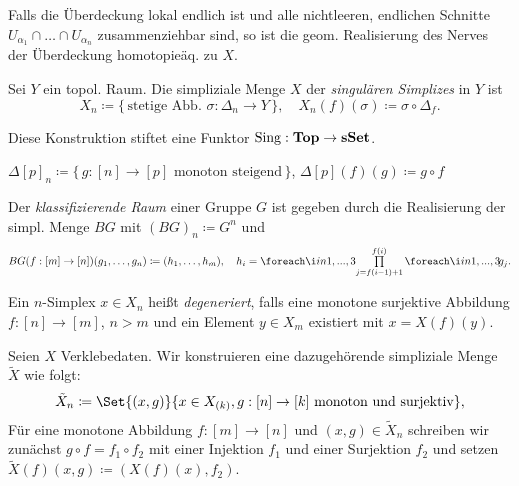 \documentclass{cheat-sheet}
\newcommand{\nspace}[1]{\foreach \i in {1,...,#1}{ \! }} %
\DeclareMathOperator{\Sing}{Sing} %
\begin{document}
\begin{bem}
  Falls die Überdeckung lokal endlich ist und alle nichtleeren, endlichen Schnitte $U_{\alpha_1} \cap \ldots \cap U_{\alpha_n}$ zusammenziehbar sind, so ist die geom. Realisierung des Nerves der Überdeckung homotopieäq. zu $X$.
\end{bem}

\begin{defn}
  Sei $Y$ ein topol. Raum. Die simpliziale Menge $X$ der \emph{singulären Simplizes} in $Y$ ist
  \[
    X_n \coloneqq \{ \, \text{stetige Abb. } \sigma : \Delta_n \to Y \, \}, \quad
    X_n(f)(\sigma) \coloneqq \sigma \circ \Delta_f.
  \]
\end{defn}

\begin{bem}
  Diese Konstruktion stiftet eine Funktor $\Sing : \Top \to \sSet$.
\end{bem}

\begin{defn}
  $\Delta[p]_n \coloneqq \{ \, g : [n] \to [p] \text{ monoton steigend} \, \}$, $\Delta[p](f)(g) \coloneqq g \circ f$
\end{defn}

\begin{defn}
  Der \emph{klassifizierende Raum} einer Gruppe $G$ ist gegeben durch die Realisierung der simpl. Menge $BG$ mit $(BG)_n \coloneqq G^n$ und
  \begin{align*}
    BG(f : [m] \to [n])(g_1, \ldots, g_n) \coloneqq
    (h_1, \ldots, h_m), \quad h_i = \nspace{3} \prod_{j=f(i-1)+1}^{f(i)} \nspace{3} g_j.
  \end{align*}
\end{defn}

\begin{defn}
  Ein $n$-Simplex $x \in X_n$ heißt \emph{degeneriert}, falls eine monotone surjektive Abbildung $f : [n] \to [m]$, $n > m$ und ein Element $y \in X_m$ existiert mit $x = X(f)(y)$.
\end{defn}

\begin{defn}
  Seien $X$ Verklebedaten. Wir konstruieren eine dazugehörende simpliziale Menge $\tilde{X}$ wie folgt:
  \[ \tilde{X}_n \coloneqq \Set{ (x, g) }{ x \in X_{(k)}, g : [n] \to [k] \text{ monoton und surjektiv} }, \]
  Für eine monotone Abbildung $f : [m] \to [n]$ und $(x, g) \in \tilde{X}_n$ schreiben wir zunächst $g \circ f = f_1 \circ f_2$ mit einer Injektion $f_1$ und einer Surjektion $f_2$ und setzen
  $\tilde{X}(f)(x, g) \coloneqq (X(f)(x), f_2)$.
\end{defn}
\end{document}
